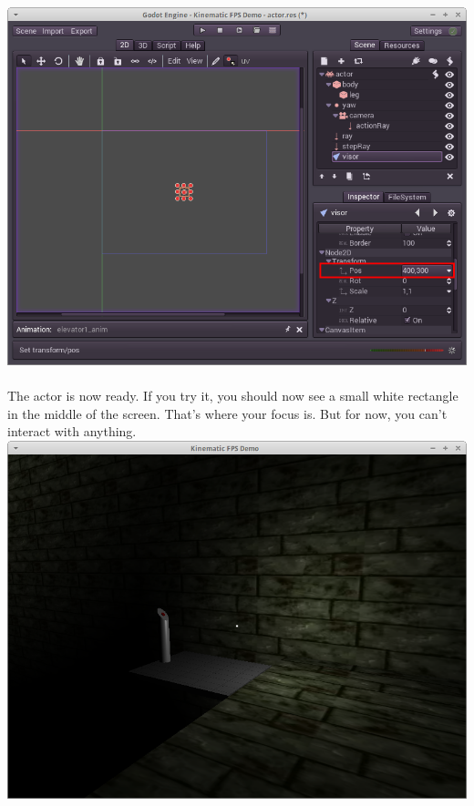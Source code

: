 \documentclass[10pt,a4paper]{article}
\begin{document}
\includegraphics[scale=0.45]{godot_step37.png} 
\\\\
The actor is now ready. If you try it, you should now see a small white rectangle in the middle of the screen. That's where your focus is. But for now, you can't interact with anything.\\
\includegraphics[scale=0.45]{godot_step38.png} 
\end{document}
